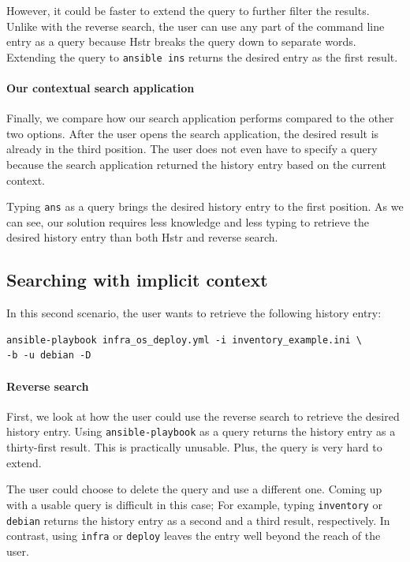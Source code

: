 However, it could be faster to extend the query to further filter the results. Unlike with the reverse search, the user can use any part of the command line entry as a query because Hstr breaks the query down to separate words. Extending the query to \verb|ansible ins| returns the desired entry as the first result.


\paragraph{Our contextual search application}
Finally, we compare how our search application performs compared to the other two options.
After the user opens the search application, the desired result is already in the third position. The user does not even have to specify a query because the search application returned the history entry based on the current context.

Typing \verb|ans| as a query brings the desired history entry to the first position. As we can see, our solution requires less knowledge and less typing to retrieve the desired history entry than both Hstr and reverse search. 

\subsection{Searching with implicit context}

In this second scenario, the user wants to retrieve the following history entry:

\begin{verbatim}
ansible-playbook infra_os_deploy.yml -i inventory_example.ini \
-b -u debian -D
\end{verbatim}

\paragraph{Reverse search} 
First, we look at how the user could use the reverse search to retrieve the desired history entry.
Using \verb|ansible-playbook| as a query returns the history entry as a thirty-first result. This is practically unusable. Plus, the query is very hard to extend.

The user could choose to delete the query and use a different one. Coming up with a usable query is difficult in this case; For example, typing \verb|inventory| or \verb|debian| returns the history entry as a second and a third result, respectively. In contrast, using \verb|infra| or \verb|deploy| leaves the entry well beyond the reach of the user. 

